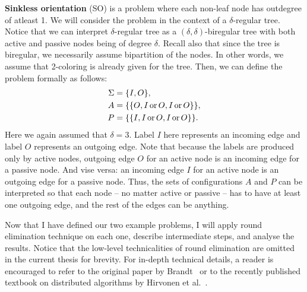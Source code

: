 \textbf{Sinkless orientation} (SO) is a problem
where each non-leaf node has outdegree of atleast 1.
We will consider the problem in the context of
a $\delta$-regular tree.
Notice that we can interpret $\delta$-regular
tree as a
$(\delta, \delta)$-biregular tree with
both active and passive nodes being of degree $\delta$.
Recall also that since the tree is biregular, we
necessarily assume bipartition of the nodes. In other words,
we assume that 2-coloring is already given for the tree.
Then, we can define the problem formally as follows:
\begin{align*}
\Sigma &= \{I, O\}, \\
A &= \{ \{O, I \operatorname{or} O, I \operatorname{or} O\} \}, \\
P &= \{ \{I, I \operatorname{or} O, I \operatorname{or} O\}\}.
\end{align*}
Here we again assumed that $\delta = 3$. Label $I$ here represents
an incoming edge and label $O$ represents an outgoing edge.
Note that because the labels are produced only by active nodes,
outgoing edge $O$ for an active node is an incoming edge for a 
passive node. And vise versa: an incoming edge $I$ for an active node
is an outgoing edge for a passive node. Thus, the sets of configurations
$A$ and $P$ can be interpreted so that each node -- no matter active or passive --
has to have at least one outgoing edge, and the rest of the edges can be anything.

Now that I have defined our two example problems,
I will apply round elimination
technique on each one, describe intermediate steps, and analyse the results.
Notice that the low-level technicalities of round elimination
are omitted in the current thesis for brevity. For in-depth technical details, a reader is encouraged
to refer to the original paper by Brandt~\cite{Brandt2019} or to the recently published textbook on distributed algorithms
by Hirvonen et al.~\cite{Hirvonen2020}.

